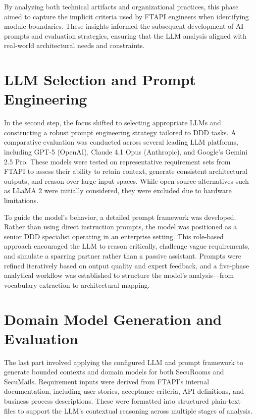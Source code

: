 By analyzing both technical artifacts and organizational practices, this phase aimed to capture the implicit criteria used by FTAPI engineers when identifying module boundaries. These insights informed the subsequent development of AI prompts and evaluation strategies, ensuring that the LLM analysis aligned with real-world architectural needs and constraints.

\section{LLM Selection and Prompt Engineering}

In the second step, the focus shifted to selecting appropriate LLMs and constructing a robust prompt engineering strategy tailored to DDD tasks. A comparative evaluation was conducted across several leading LLM platforms, including GPT-5 (OpenAI), Claude 4.1 Opus (Anthropic), and Google's Gemini 2.5 Pro. These models were tested on representative requirement sets from FTAPI to assess their ability to retain context, generate consistent architectural outputs, and reason over large input spaces. While open-source alternatives such as LLaMA 2 were initially considered, they were excluded due to hardware limitations.

To guide the model's behavior, a detailed prompt framework was developed. Rather than using direct instruction prompts, the model was positioned as a senior DDD specialist operating in an enterprise setting. This role-based approach encouraged the LLM to reason critically, challenge vague requirements, and simulate a sparring partner rather than a passive assistant. Prompts were refined iteratively based on output quality and expert feedback, and a five-phase analytical workflow was established to structure the model's analysis—from vocabulary extraction to architectural mapping.

\section{Domain Model Generation and Evaluation}

The last part involved applying the configured LLM and prompt framework to generate bounded contexts and domain models for both SecuRooms and SecuMails. Requirement inputs were derived from FTAPI's internal documentation, including user stories, acceptance criteria, API definitions, and business process descriptions. These were formatted into structured plain-text files to support the LLM's contextual reasoning across multiple stages of analysis.

